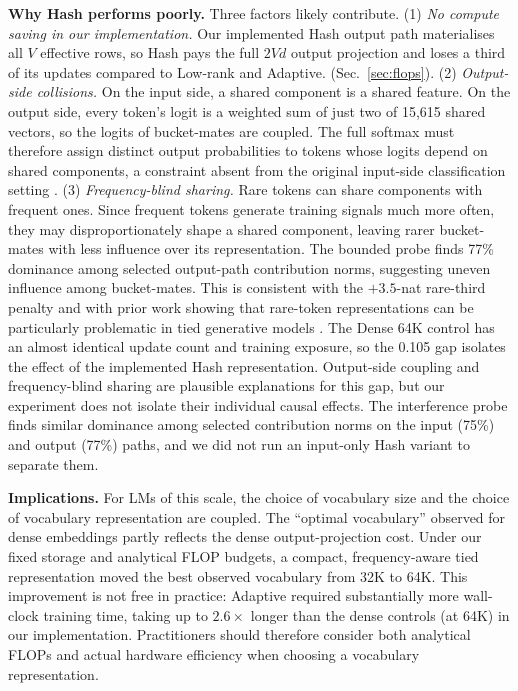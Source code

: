 \documentclass[10pt,a4paper]{article}
\newcommand{\bpb}{\text{BPB}}
\begin{document}
\textbf{Why Hash performs poorly.} Three factors likely contribute. (1) \emph{No compute saving in our implementation.} Our implemented Hash output path
materialises all $V$ effective rows, so Hash pays the full $2Vd$ output projection and loses a third of its updates compared to Low-rank and Adaptive.
(Sec.~\ref{sec:flops}). (2) \emph{Output-side collisions.} On the input side, a shared component is a shared feature. On the output side, every token's 
logit is a weighted sum of just two of 15,615 shared vectors, so the logits of bucket-mates are coupled. The full softmax must therefore assign distinct 
output probabilities to tokens whose logits depend on shared components, a constraint absent from the original input-side classification setting 
\citep{svenstrup2017hash}. (3) \emph{Frequency-blind sharing.} Rare tokens can share components with frequent ones. Since frequent tokens generate training signals much more often, they may disproportionately shape a shared component, 
leaving rarer bucket-mates with less influence over its representation. The bounded probe finds 77\% dominance among selected output-path contribution norms, suggesting uneven influence among bucket-mates. This is consistent with the
$+3.5$-nat rare-third penalty and with prior work showing that rare-token representations can be particularly problematic in tied generative models \citep{gao2019degeneration}. 
The Dense 64K control has an almost identical update count and training exposure, so the 0.105 \bpb{} gap isolates the effect of the implemented Hash representation. Output-side 
coupling and frequency-blind sharing are plausible explanations for this gap, but our experiment does not isolate their individual causal effects. The interference probe finds 
similar dominance among selected contribution norms on the input (75\%) and output (77\%) paths, and we did not run an input-only Hash variant to separate them.

\textbf{Implications.} For LMs of this scale, the choice of vocabulary size and the choice of vocabulary representation are coupled. The ``optimal vocabulary'' 
observed for dense embeddings partly reflects the dense output-projection cost. Under our fixed storage and analytical FLOP budgets, a compact, frequency-aware 
tied representation moved the best observed vocabulary from 32K to 64K. This improvement is not free in practice: Adaptive required substantially more wall-clock 
training time, taking up to $2.6\times$ longer than the dense controls (at 64K) in our implementation. Practitioners should therefore consider both analytical FLOPs and 
actual hardware efficiency when choosing a vocabulary representation.
\end{document}
